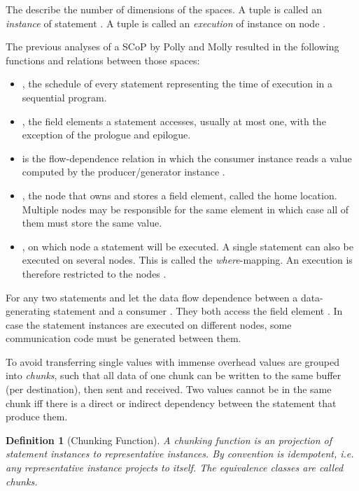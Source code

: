 \documentclass{sigplanconf}
\newtheorem{definition}{Definition}
\begin{document}
The  describe the number of dimensions of the spaces. A tuple  is called an \emph{instance} of statement . A tuple  is called an \emph{execution} of instance  on node . 

The previous analyses of a SCoP by Polly and Molly resulted in the following functions and relations between those spaces:

\begin{itemize}
\item , the schedule of every statement representing the time of execution in a sequential program.
\item , the field elements a statement accesses, usually at most one, with the exception of the prologue and epilogue.
\item  is the flow-dependence relation in which the consumer instance  reads a value computed by the producer/generator instance .

\item , the node that owns and stores a field element, called the home location. Multiple nodes may be responsible for the same element in which case all of them must store the same value.
\item , on which node a statement will be executed. A single statement can also be executed on several nodes. This is called the \emph{where}-mapping. An execution  is therefore restricted to the nodes .
\end{itemize}

For any two statements  and  let  the data flow dependence between a data-generating statement  and a consumer . They both access the field element . In case the statement instances are executed on different nodes, some communication code must be generated between them.

To avoid transferring single values with immense overhead values are grouped into \emph{chunks}, such that all data of one chunk can be written to the same buffer (per destination), then sent and received. Two values cannot be in the same chunk iff there is a direct or indirect dependency between the statement that produce them.

\begin{definition}[Chunking Function]
A \emph{chunking function} is an projection  of statement instances to representative instances. By convention  is idempotent, i.e. any representative instance projects to itself. The equivalence classes  are called \emph{chunks}.
\end{definition}
\end{document}
